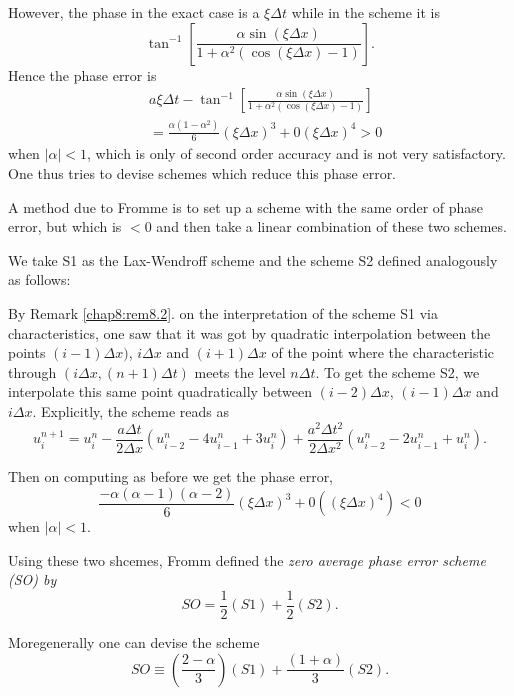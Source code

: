 However, the phase in the exact case is a $\xi \Delta t$ while in the scheme it is 
$$
\tan^{-1} \left[\frac{\alpha \sin (\xi \Delta x)}{1 + \alpha^2 (\cos (\xi \Delta x) -1)} \right].
$$
Hence the phase error is 
\begin{align*}
& a \xi \Delta t - \tan^{-1} \left[\frac{\alpha \sin (\xi \Delta x)}{1+\alpha^2 (\cos (\xi \Delta x) - 1)} \right]\\
& = \frac{\alpha (1-\alpha^2)}{6} (\xi \Delta x)^3 + 0 (\xi \Delta x)^4 > 0
\tag{8.40}\label{eq8.40}
\end{align*}\pageoriginale
when $|\alpha| <1$, which is only of second order accuracy and is not very satisfactory. One thus tries to devise schemes which reduce this phase error.

A method due to Fromme \cite{key11, key12} is to set up a scheme with the same order of phase error, but which is $< 0$ and then take a linear combination of these two schemes. 

We take S1 as the Lax-Wendroff scheme and the scheme S2 defined analogously as follows:

By Remark \ref{chap8:rem8.2}. on the interpretation of the scheme S1 via characteristics, one saw that it was got by quadratic interpolation between the points $(i-1)\Delta x)$, $i\Delta x$ and $(i+1)\Delta x$ of the point where the characteristic through $(i \Delta x, (n+1)\Delta t)$ meets the level $n\Delta t$. To get the scheme S2, we interpolate this same point quadratically between $(i-2) \Delta x$, $(i-1)\Delta x$ and $i\Delta x$. Explicitly, the scheme reads as 
\begin{equation*}
u^{n+1}_i = u^n_i - \frac{a \Delta t}{2\Delta x} (u^n_{i-2} - 4u^n_{i-1} + 3u^n_i) + \frac{a^2 \Delta t^2}{2 \Delta x^2}  (u^n_{i-2} - 2u^n_{i-1} + u^n_i).\tag{8.41}\label{eq8.41}
\end{equation*}

Then on computing as before we get the phase error,
$$
\frac{-\alpha (\alpha -1) (\alpha -2)}{6} (\xi \Delta x)^3 + 0((\xi \Delta x)^4 ) < 0  
$$
when $|\alpha| <1$. 

Using these two shcemes, Fromm defined the {\em zero average phase error scheme (SO) by}
\begin{equation*}
SO = \frac{1}{2} (S1) + \frac{1}{2} (S2).\tag{8.42}\label{eq8.42}
\end{equation*}

More\pageoriginale generally one can devise the scheme
\begin{equation*}
SO \equiv \left(\frac{2-\alpha}{3}\right) (S1) + \frac{(1+\alpha)}{3} (S2). 
\tag{8.43}\label{eq8.43}
\end{equation*}

